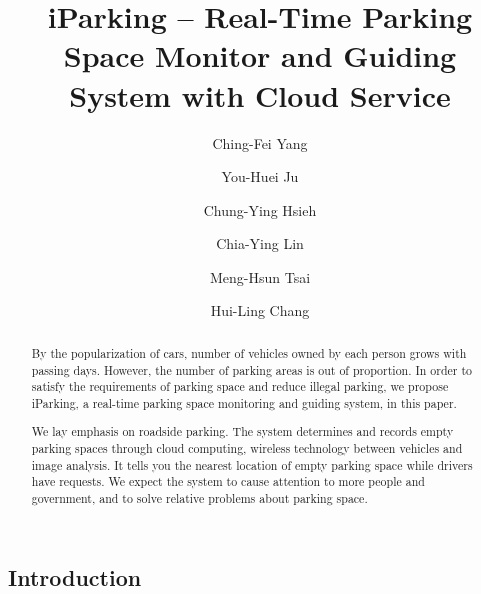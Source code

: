 \documentclass[runningheads,a4paper]{llncs}
\begin{document}
\begin{CJK}{UTF8}{bsmi}



\title{iParking -- Real-Time Parking Space Monitor and Guiding System with Cloud Service}

\author{Ching-Fei Yang \and You-Huei Ju \and Chung-Ying Hsieh \and
Chia-Ying Lin \and Meng-Hsun Tsai \and Hui-Ling Chang}
{}

\maketitle

\begin{abstract}
By the popularization of cars, number of vehicles owned by each person
grows with passing days. However, the number of parking areas is out of
proportion. In order to satisfy the requirements of parking space and
reduce illegal parking, we propose iParking, a real-time parking space
monitoring and guiding system, in this paper. 

We lay emphasis on roadside parking. The system determines and records
empty parking spaces through cloud computing, wireless technology
between vehicles and image analysis. It tells you the nearest location
of empty parking space while drivers have requests. We expect the system
to cause attention to more people and government, and to solve relative
problems about parking space. 
\end{abstract}


\section{Introduction}\label{sec:intro}


\end{CJK}
\end{document}

